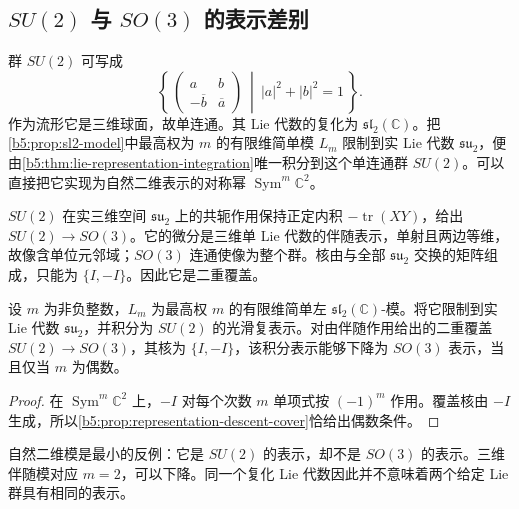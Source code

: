 \subsection{\texorpdfstring{\(SU(2)\) 与 \(SO(3)\) 的表示差别}{SU(2) 与 SO(3) 的表示差别}}
\label{b5:subsec:C01:03}

群 \(SU(2)\) 可写成
\[
	\left\{\,
	\begin{pmatrix}a&b\\-\overline b&\overline a\end{pmatrix}
	\ \middle|\ |a|^2+|b|^2=1\,\right\}.
\]
作为流形它是三维球面，故单连通。其 Lie 代数的复化为 \(\mathfrak{sl}_2(\mathbb C)\)。把\cref{b5:prop:sl2-model}中最高权为 \(m\) 的有限维简单模 \(L_m\) 限制到实 Lie 代数 \(\mathfrak{su}_2\)，便由\cref{b5:thm:lie-representation-integration}唯一积分到这个单连通群 \(SU(2)\)。可以直接把它实现为自然二维表示的对称幂 \(\operatorname{Sym}^m\mathbb C^2\)。

\ProseParagraphBreak
\(SU(2)\) 在实三维空间 \(\mathfrak{su}_2\) 上的共轭作用保持正定内积 \(-\operatorname{tr}(XY)\)，给出 \(SU(2)\to SO(3)\)。它的微分是三维单 Lie 代数的伴随表示，单射且两边等维，故像含单位元邻域；\(SO(3)\) 连通使像为整个群。核由与全部 \(\mathfrak{su}_2\) 交换的矩阵组成，只能为 \(\{I,-I\}\)。因此它是二重覆盖。

\begin{proposition}\label{b5:prop:su2-so3-parity}
	设 \(m\) 为非负整数，\(L_m\) 为最高权 \(m\) 的有限维简单左 \(\mathfrak{sl}_2(\mathbb C)\)-模。将它限制到实 Lie 代数 \(\mathfrak{su}_2\)，并积分为 \(SU(2)\) 的光滑复表示。对由伴随作用给出的二重覆盖 \(SU(2)\to SO(3)\)，其核为 \(\{I,-I\}\)，该积分表示能够下降为 \(SO(3)\) 表示，当且仅当 \(m\) 为偶数。
\end{proposition}
\begin{proof}
	在 \(\operatorname{Sym}^m\mathbb C^2\) 上，\(-I\) 对每个次数 \(m\) 单项式按 \((-1)^m\) 作用。覆盖核由 \(-I\) 生成，所以\cref{b5:prop:representation-descent-cover}恰给出偶数条件。
\end{proof}

自然二维模是最小的反例：它是 \(SU(2)\) 的表示，却不是 \(SO(3)\) 的表示。三维伴随模对应 \(m=2\)，可以下降。同一个复化 Lie 代数因此并不意味着两个给定 Lie 群具有相同的表示。
